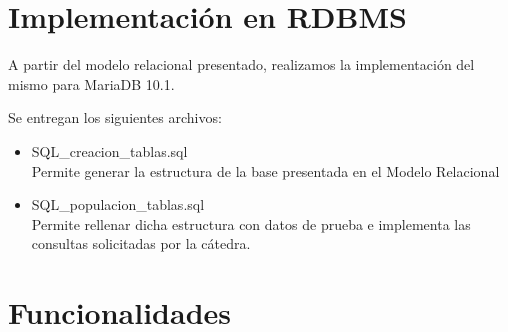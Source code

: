 \section{Implementación en RDBMS}
A partir del modelo relacional presentado, realizamos la implementación del mismo para MariaDB 10.1.

Se entregan los siguientes archivos:

\begin{itemize}
    \item SQL\_creacion\_tablas.sql \\
    Permite generar la estructura de la base presentada en el Modelo Relacional
    \item SQL\_populacion\_tablas.sql \\
    Permite rellenar dicha estructura con datos de prueba e implementa las consultas solicitadas por la cátedra.
\end{itemize}

\section{Funcionalidades}

